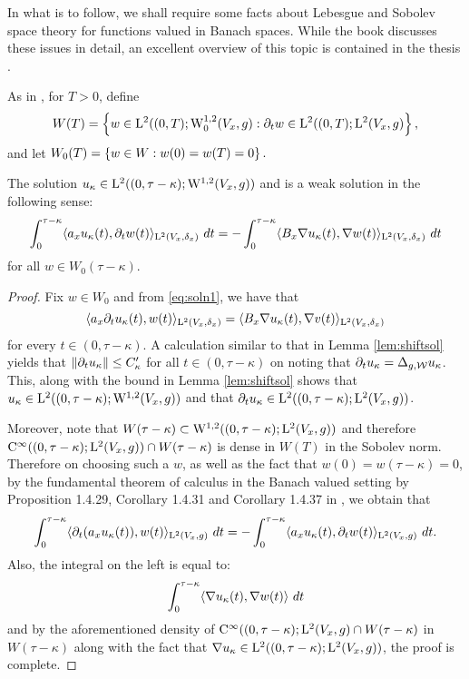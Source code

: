 \documentclass[a4paper, 12pt]{amsart}
\begin{document}
In what is to follow, we shall require some facts about 
Lebesgue and Sobolev space theory for functions valued 
in Banach spaces. While the book \cite{CH} discusses these issues
in detail, an excellent overview of this topic
is contained in the thesis \cite{Kreuter}.

As in \cite{CS}, for $T > 0$, define 
$$ W(T) = \set{ w \in \Lp{2}( (0,T); \SobH[0]{1}(V_x,g): \partial_t w \in \Lp{2}((0,T); \Lp{2}(V_x, g)},$$
and let $W_0(T) = \set{ w \in W: w(0) = w(T) = 0}.$

\begin{lemma}
\label{Lem:testfn2} 
The solution $u_\kappa \in \Lp{2}((0, \tau - \kappa); \SobH{1}(V_x, g))$
and is a weak solution in the following sense:
\begin{equation}
\label{eq:testfn2} 
\int_{0}^{\tau - \kappa} \inprod{a_x u_\kappa(t), \partial_t w(t)}_{\Lp{2}(V_x,\delta_x)}\ dt 
		= -\int_{0}^{\tau - \kappa } \inprod{B_x \nabla u_\kappa(t), \nabla w(t)}_{\Lp{2}(V_x, \delta_x)}\ dt
\end{equation}
for all $w \in W_0(\tau - \kappa)$.
\end{lemma}
\begin{proof}
Fix $w \in W_0$ and from \eqref{eq:soln1}, we have that
$$\inprod{a_x \partial_t u_\kappa (t), w(t)}_{\Lp{2}(V_x, \delta_x)} 
		= \inprod{ B_x \nabla u_\kappa(t), \nabla v(t)}_{\Lp{2}(V_x, \delta_x)}$$
for every $t \in (0, \tau - \kappa)$.
A calculation similar to that in Lemma \ref{lem:shiftsol} 
yields that $\norm{ \partial_t u_\kappa} \leq C_\kappa'$
for all $t \in (0, \tau - \kappa)$
on noting that $\partial_t u_\kappa = \Delta_{g,\cW} u_\kappa$.
This, along with the bound in Lemma \ref{lem:shiftsol}
shows that  $u_\kappa \in \Lp{2}((0, \tau - \kappa); \SobH{1}(V_x, g))$
and that $\partial_t u_\kappa \in \Lp{2}((0,\tau - \kappa); \Lp{2}(V_x, g))$. 

Moreover, note that $W(\tau- \kappa) \subset \SobH{1}((0,\tau-\kappa); \Lp{2}(V_x,g))$
and therefore $\Ck{\infty}((0,\tau-\kappa); \Lp{2}(V_x,g)) \intersect W(\tau - \kappa)$
is dense in $W(T)$ in the Sobolev norm. Therefore on 
choosing such a $w$, as well as the fact that $w(0) = w(\tau - \kappa) = 0$, 
by the fundamental theorem of calculus in the Banach 
valued setting by Proposition 1.4.29, Corollary 1.4.31 and Corollary 1.4.37 in  \cite{CH}, we obtain that
$$\int_{0}^{\tau - \kappa} \inprod{ \partial_t(a_x u_\kappa(t)), w(t)}_{\Lp{2}(V_x,g)}\ dt
	= - \int_0^{\tau - \kappa} \inprod{a_x u_\kappa(t), \partial_t w(t)}_{\Lp{2}(V_x, g)}\ dt.$$
Also, the integral on the left is equal to:
$$\int_{0}^{\tau - \kappa} \inprod{ \nabla u_\kappa(t), \nabla w(t)}\ dt$$
and by the aforementioned density of
 $\Ck{\infty}((0,\tau-\kappa); \Lp{2}(V_x,g) \intersect W(\tau - \kappa)$ 
in $W(\tau - \kappa)$ along with the fact that $\nabla u_\kappa \in \Lp{2}((0, \tau - \kappa); \Lp{2}(V_x,g))$,
the proof is complete.
\end{proof} 
\end{document}
